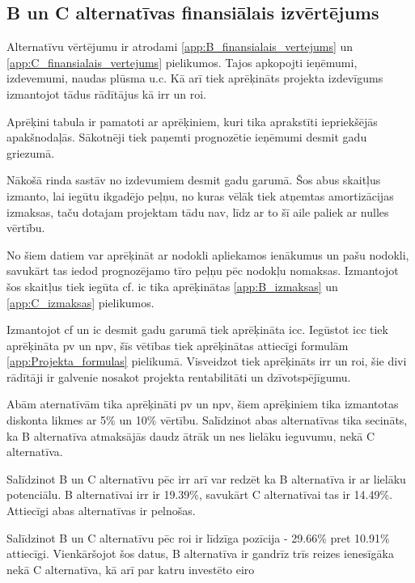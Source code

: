 \subsection{B un C alternatīvas finansiālais izvērtējums}
Alternatīvu vērtējumu ir atrodami \ref{app:B_finansialais_vertejums} un \ref{app:C_finansialais_vertejums} pielikumos.
Tajos apkopojti ieņēmumi, izdevemumi, naudas plūsma u.c. Kā arī tiek aprēķināts projekta izdevīgums izmantojot
tādus rādītājus kā \gls{irr} un \gls{roi}.
\par
Aprēķini tabula ir pamatoti ar aprēķiniem, kuri tika aprakstīti iepriekšējās apakšnodaļās. Sākotnēji
tiek paņemti prognozētie ieņēmumi desmit gadu griezumā.
\par 
Nākošā rinda sastāv no izdevumiem desmit gadu garumā. Šos abus skaitļus izmanto, lai iegūtu ikgadējo 
peļņu, no kuras vēlāk tiek atņemtas amortizācijas izmaksas, taču dotajam projektam tādu nav, līdz 
ar to šī aile paliek ar nulles vērtību.
\par 
No šiem datiem var aprēķināt ar nodokli apliekamos ienākumus un pašu nodokli, savukārt tas iedod
prognozējamo tīro peļņu pēc nodokļu nomaksas. Izmantojot šos skaitļus tiek iegūta \gls{cf}. \Gls{ic} tika aprēķinātas 
\ref{app:B_izmaksas} un \ref{app:C_izmaksas} pielikumos. 
\par
Izmantojot \acrshort{cf} un \acrshort{ic} desmit gadu garumā tiek aprēķināta \gls{icc}. Iegūstot \acrshort{icc} 
tiek aprēķināta \gls{pv} un \gls{npv}, šīs vētības tiek aprēķinātas attiecīgi formulām \ref{app:Projekta_formulas}
pielikumā. Visveidzot tiek aprēķināts \acrshort{irr} un \acrshort{roi}, šie divi rādītāji ir galvenie nosakot 
projekta rentabilitāti un dzīvotspējīgumu.
\par
Abām aternatīvām tika aprēķināti \acrshort{pv} un \acrshort{npv}, šiem aprēķiniem tika izmantotas diskonta
likmes ar 5\% un 10\% vērtību. Salīdzinot abas alternatīvas tika secināts, ka B alternatīva atmaksājās daudz
ātrāk un nes lielāku ieguvumu, nekā C alternatīva. 
\par
Salīdzinot B un C alternatīvu pēc \gls{irr} arī var redzēt ka B alternatīva ir ar lielāku potenciālu.
B alternatīvai \gls{irr} ir 19.39\%, savukārt C alternatīvai tas ir 14.49\%. Attiecīgi abas alternatīvas ir
pelnošas.
\par
Salīdzinot B un C alternatīvu pēc \gls{roi} ir līdzīga pozīcija - 29.66\% pret 10.91\% attiecīgi. Vienkāršojot
šos datus, B alternatīva ir gandrīz trīs reizes ienesīgāka nekā C alternatīva, kā arī par katru investēto eiro
